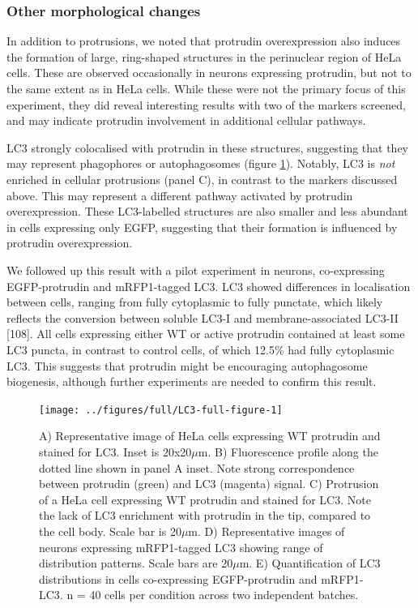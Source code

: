 \documentclass[
  12pt,
  a4paper,
]{book}
\begin{document}
\hypertarget{other-morphological-changes}{%
\subsubsection{Other morphological changes}\label{other-morphological-changes}}

In addition to protrusions, we noted that protrudin overexpression also induces the formation of large, ring-shaped structures in the perinuclear region of HeLa cells. These are observed occasionally in neurons expressing protrudin, but not to the same extent as in HeLa cells. While these were not the primary focus of this experiment, they did reveal interesting results with two of the markers screened, and may indicate protrudin involvement in additional cellular pathways.

LC3 strongly colocalised with protrudin in these structures, suggesting that they may represent phagophores or autophagosomes (figure \ref{fig:LC3-full-figure}). Notably, LC3 is \emph{not} enriched in cellular protrusions (panel C), in contrast to the markers discussed above. This may represent a different pathway activated by protrudin overexpression. These LC3-labelled structures are also smaller and less abundant in cells expressing only EGFP, suggesting that their formation is influenced by protrudin overexpression.

We followed up this result with a pilot experiment in neurons, co-expressing EGFP-protrudin and mRFP1-tagged LC3. LC3 showed differences in localisation between cells, ranging from fully cytoplasmic to fully punctate, which likely reflects the conversion between soluble LC3-I and membrane-associated LC3-II {[}108{]}. All cells expressing either WT or active protrudin contained at least some LC3 puncta, in contrast to control cells, of which 12.5\% had fully cytoplasmic LC3. This suggests that protrudin might be encouraging autophagosome biogenesis, although further experiments are needed to confirm this result.

\begin{figure}
\texttt{[image: ../figures/full/LC3-full-figure-1]} \caption[Protrudin effect on LC3 localisation in HeLa cells and cortical neurons]{A) Representative image of HeLa cells expressing WT protrudin and stained for LC3.  Inset is 20x20$\mu$m.  B) Fluorescence profile along the dotted line shown in panel A inset.  Note strong correspondence between protrudin (green) and LC3 (magenta) signal.  C) Protrusion of a HeLa cell expressing WT protrudin and stained for LC3.  Note the lack of LC3 enrichment with protrudin in the tip, compared to the cell body.  Scale bar is 20$\mu$m.  D) Representative images of neurons expressing mRFP1-tagged LC3 showing range of distribution patterns.  Scale bars are 20$\mu$m.  E) Quantification of LC3 distributions in cells co-expressing EGFP-protrudin and mRFP1-LC3.  n = 40 cells per condition across two independent batches.}\label{fig:LC3-full-figure}
\end{figure}
\end{document}
